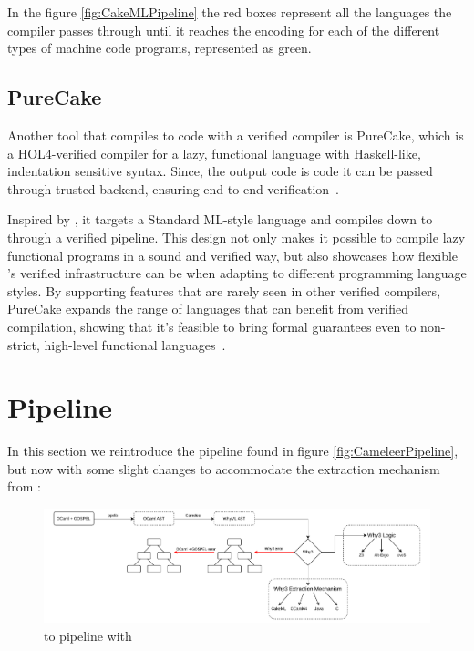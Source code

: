 In the figure \ref{fig:CakeMLPipeline} the red boxes represent all the languages the compiler passes through until it reaches the
encoding for each of the different types of machine code programs, represented as green.

\subsection{PureCake}

Another tool that compiles to \cml code with a verified compiler is PureCake, which is a HOL4-verified compiler for a lazy, 
functional language with Haskell-like, indentation sensitive syntax. Since, the output code is \cml code it can be passed 
through \cml trusted backend, ensuring end-to-end verification~\cite{KanabarVAMNPZ23}.

Inspired by \compcert, it targets a Standard ML-style language and compiles down to \cml through a verified pipeline.
This design not only makes it possible to compile lazy functional programs in a sound and verified way, but also showcases 
how flexible \cml's verified infrastructure can be when adapting to different programming language styles. 
By supporting features that are rarely seen in other verified compilers, PureCake expands the range of languages that can 
benefit from verified compilation, showing that it's feasible to bring formal guarantees even to non-strict, high-level 
functional languages~\cite{KanabarVAMNPZ23, KanabarKM24}.

\section{Pipeline}
\label{sec:Pipeline}

In this section we reintroduce the \cameleer pipeline found in figure \ref{fig:CameleerPipeline}, but now with some slight changes
to accommodate the extraction mechanism from \whythree :

\begin{figure}[H]
    \centering
    \includegraphics[width=\linewidth]{images/cameleer_extract.pdf}
    \caption{\ocaml to \whyml pipeline with \cameleer}
    \label{fig:Cameleer_pipeline}
\end{figure}


